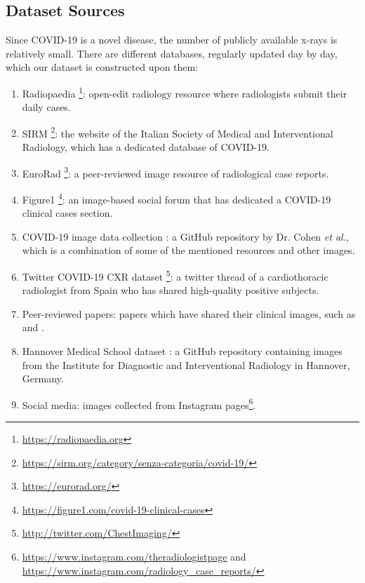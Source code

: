\documentclass{article}
\begin{document}
\subsection{Dataset Sources}
Since COVID-19 is a novel disease, the number of publicly available x-rays is relatively small. There are different databases, regularly updated day by day, which our dataset is constructed upon them:
\begin{enumerate}
    \item Radiopaedia \footnote{\href{https://radiopaedia.org}{https://radiopaedia.org}}: open-edit radiology resource where radiologists submit their daily cases.
    \item SIRM \footnote{\href{https://sirm.org/category/senza-categoria/covid-19/}{https://sirm.org/category/senza-categoria/covid-19/}}: the website of the Italian Society of Medical and Interventional Radiology, which has a dedicated database of COVID-19.
    \item EuroRad \footnote{\href{https://eurorad.org/}{https://eurorad.org/}}: a peer-reviewed image resource of radiological case reports.
    \item Figure1 \footnote{\href{https://figure1.com/covid-19-clinical-cases}{https://figure1.com/covid-19-clinical-cases}}: an image-based social forum that has dedicated a COVID-19 clinical cases section.
    \item COVID-19 image data collection \cite{cohen2020covid}: a GitHub repository by Dr. Cohen \textit{et al.}, which is a combination of some of the mentioned resources and other images.
    \item Twitter COVID-19 CXR dataset \footnote{\href{http://twitter.com/ChestImaging/}{http://twitter.com/ChestImaging/}}: a twitter thread of a cardiothoracic radiologist from Spain who has shared high-quality positive subjects.
    \item Peer-reviewed papers: papers which have shared their clinical images, such as \cite{jacobi2020portable} and \cite{qian2020severe}.
    \item Hannover Medical School dataset \cite{hannover2020covid}: a GitHub repository containing images from the Institute for Diagnostic and Interventional Radiology in Hannover, Germany.
    \item Social media: images collected from Instagram pages\footnote{\href{https://www.instagram.com/theradiologistpage}{https://www.instagram.com/theradiologistpage} and \href{https://www.instagram.com/radiology\_case\_reports/}{https://www.instagram.com/radiology\_case\_reports/}}.
\end{enumerate}
\end{document}
